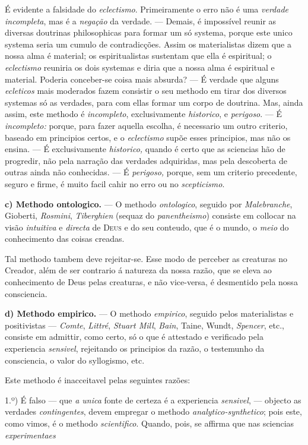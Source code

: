 É evidente a falsidade do \emph{eclectismo}. Primeiramente o erro não é uma \emph{verdade incompleta}, mas é a \emph{negação} da verdade. --- Demais, é impossível reunir as diversas doutrinas philosophicas para formar um só systema, porque este unico systema seria um cumulo de contradicções. Assim os materialistas dizem que a nossa alma é material; os espiritualistas sustentam que ella é espiritual; o \emph{eclectismo} reuniria os dois systemas e diria que a nossa alma é espiritual e material. Poderia conceber-se coisa mais absurda? --- É verdade que alguns \emph{ecleticos} mais moderados fazem consistir o seu methodo em tirar dos diversos systemas só as verdades, para com ellas formar um corpo de doutrina. Mas, ainda assim, este methodo é \emph{incompleto}, exclusivamente \emph{historico}, e \emph{perigoso}. --- É \emph{incompleto:} porque, para fazer aquella escolha, é necessario um outro criterio, baseado em principios certos, e o \emph{eclectismo} supõe esses principios, mas não os ensina. --- É exclusivamente \emph{historico,} quando é certo que as sciencias hão de progredir, não pela narração das verdades adquiridas, mas pela descoberta de outras ainda não conhecidas. --- É \emph{perigoso,} porque, sem um criterio precedente, seguro e firme, é muito facil cahir no erro ou no \emph{scepticismo}.

\textbf{c) Methodo ontologico.} --- O methodo \emph{ontologico}, seguido por \emph{Malebranche}, Gioberti, \emph{Rosmini}, \emph{Tiberghien} (sequaz do \emph{panentheismo}) consiste em collocar na visão \emph{intuitiva} e \emph{directa} de \textsc{Deus} e do seu conteudo, que é o mundo, o \emph{meio} do conhecimento das coisas creadas.

Tal methodo tambem deve rejeitar-se. Esse modo de perceber as creaturas no Creador, além de ser contrario á natureza da nossa razão, que se eleva ao conhecimento de Deus pelas creaturas, e não vice-versa, é desmentido pela nossa consciencia.

\textbf{d) Methodo empirico.} --- O methodo \emph{empirico}, seguido pelos materialistas e positivistas --- \emph{Comte}, \emph{Littré}, \emph{Stuart Mill}, \emph{Bain}, Taine, Wundt, \emph{Spencer}, etc., consiste em admittir, como certo, só o que é attestado e verificado pela experiencia \emph{sensivel}, rejeitando os principios da razão, o testemunho da consciencia, o valor do syllogismo, etc.

Este methodo é inacceitavel pelas seguintes razões:

1.º) É falso --- que \emph{a unica} fonte de certeza é a experiencia \emph{sensivel}, ---   objecto as verdades \emph{contingentes}, devem empregar o methodo \emph{analytico-synthetico}; pois este, como vimos, é o methodo \emph{scientifico}. Quando, pois, se affirma que nas sciencias \emph{experimentaes}

